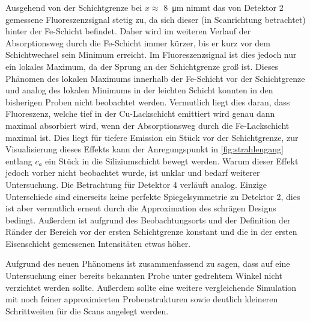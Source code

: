 Ausgehend von der Schichtgrenze bei $x\approx$ \SI{8}{\micro\meter} nimmt das von Detektor 2 gemessene Fluoreszenzsignal stetig zu, da sich dieser (in Scanrichtung betrachtet) hinter der Fe-Schicht befindet. Daher wird im weiteren Verlauf der Absorptionsweg durch die Fe-Schicht immer kürzer, bis er kurz vor dem Schichtwechsel sein Minimum erreicht. Im Fluoreszenzsignal ist dies jedoch nur ein lokales Maximum, da der Sprung an der Schichtgrenze groß ist. Dieses Phänomen des lokalen Maximums innerhalb der Fe-Schicht vor der Schichtgrenze und analog des lokalen Minimums in der leichten Schicht konnten in den bisherigen Proben nicht beobachtet werden. Vermutlich liegt dies daran, dass Fluoreszenz, welche tief in der Cu-Lackschicht emittiert wird genau dann maximal absorbiert wird, wenn der Absorptionsweg durch die Fe-Lackschicht maximal ist. Dies liegt für tiefere Emission ein Stück vor der Schichtgrenze, zur Visualisierung dieses Effekts kann der Anregungspunkt in \cref{fig:strahlengang} entlang $c_a$ ein Stück in die Siliziumschicht bewegt werden. Warum dieser Effekt jedoch vorher nicht beobachtet wurde, ist unklar und bedarf weiterer Untersuchung.\newline
Die Betrachtung für Detektor 4 verläuft analog. Einzige Unterschiede sind einerseits keine perfekte Spiegelsymmetrie zu Detektor 2, dies ist aber vermutlich erneut durch die Approximation des schrägen Designs bedingt. Außerdem ist aufgrund des Beobachtungsorts und der Definition der Ränder der Bereich vor der ersten Schichtgrenze konstant und die in der ersten Eisenschicht gemessenen Intensitäten etwas höher.\newline

Aufgrund des neuen Phänomens ist zusammenfassend zu sagen, dass auf eine Untersuchung einer bereits bekannten Probe unter gedrehtem Winkel nicht verzichtet werden sollte. Außerdem sollte eine weitere vergleichende Simulation mit noch feiner approximierten Probenstrukturen sowie deutlich kleineren Schrittweiten für die Scans angelegt werden.